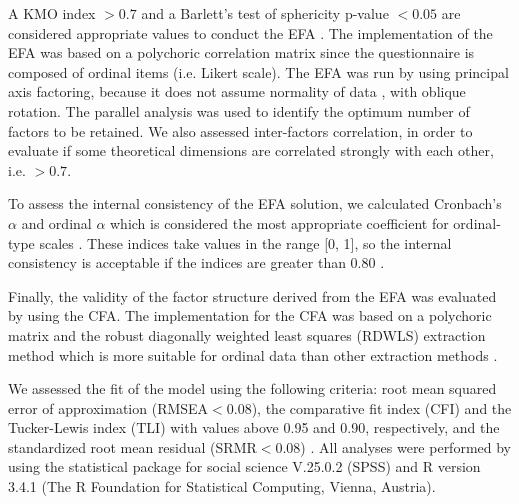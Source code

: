 \documentclass{article}
\begin{document}
A KMO index $>0.7$ and a Barlett's test of sphericity p-value  $<0.05$ are considered appropriate values to conduct the EFA \cite{Kaiser1974,Fabrigar1999}. The implementation of the EFA was based on a polychoric correlation matrix since the questionnaire is composed of ordinal items (i.e. Likert scale). The EFA was run by using principal axis factoring, because it does not assume normality of data \cite{Brown2015}, with oblique rotation. The parallel analysis was used to identify the optimum number of factors to be retained. We also assessed inter-factors correlation, in order to evaluate if  some theoretical dimensions are correlated strongly with each other, i.e. $>0.7$.

To assess the internal consistency of the EFA solution, we calculated Cronbach’s $\alpha$ and ordinal $\alpha$ which is considered the most appropriate coefficient for ordinal-type scales \cite{Gadermann2012, Zumbo2007}. These indices take values in the range [0, 1], so the internal consistency is acceptable if the indices are greater than 0.80 \cite{nunnally1994}. 

Finally, the validity of the factor structure derived from the EFA was evaluated by using the CFA. The implementation for the CFA was based on a polychoric matrix and the robust diagonally weighted least squares (RDWLS) extraction method which is more suitable for ordinal data than other extraction methods \cite{ch2016}. 
 
We assessed the fit of the model using the following criteria: root mean squared error of approximation (RMSEA$<0.08$), the comparative fit index (CFI) and  the Tucker-Lewis index (TLI) with  values above 0.95 and 0.90, respectively, and the standardized root mean residual (SRMR$ <0.08$) \cite{Taasoobshirazi2016}. 
All analyses were performed by using the statistical package for social science V.25.0.2 (SPSS) and R version 3.4.1 (The R Foundation for Statistical Computing, Vienna, Austria).
\end{document}
